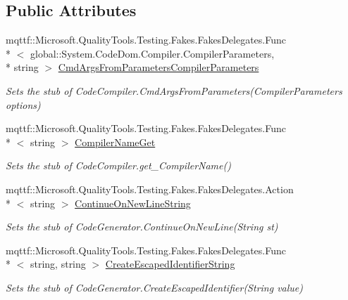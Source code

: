 \subsection*{Public Attributes}
\begin{DoxyCompactItemize}
\item 
mqttf\-::\-Microsoft.\-Quality\-Tools.\-Testing.\-Fakes.\-Fakes\-Delegates.\-Func\\*
$<$ global\-::\-System.\-Code\-Dom.\-Compiler.\-Compiler\-Parameters, \\*
string $>$ \hyperlink{class_system_1_1_code_dom_1_1_compiler_1_1_fakes_1_1_stub_code_compiler_a20ba4bb004c47eaa48c12948a27ffde8}{Cmd\-Args\-From\-Parameters\-Compiler\-Parameters}
\begin{DoxyCompactList}\small\item\em Sets the stub of Code\-Compiler.\-Cmd\-Args\-From\-Parameters(\-Compiler\-Parameters options)\end{DoxyCompactList}\item 
mqttf\-::\-Microsoft.\-Quality\-Tools.\-Testing.\-Fakes.\-Fakes\-Delegates.\-Func\\*
$<$ string $>$ \hyperlink{class_system_1_1_code_dom_1_1_compiler_1_1_fakes_1_1_stub_code_compiler_a1592c0988e2ce3f32515d11d59f7a268}{Compiler\-Name\-Get}
\begin{DoxyCompactList}\small\item\em Sets the stub of Code\-Compiler.\-get\-\_\-\-Compiler\-Name()\end{DoxyCompactList}\item 
mqttf\-::\-Microsoft.\-Quality\-Tools.\-Testing.\-Fakes.\-Fakes\-Delegates.\-Action\\*
$<$ string $>$ \hyperlink{class_system_1_1_code_dom_1_1_compiler_1_1_fakes_1_1_stub_code_compiler_a13c69a5743d57c7f1189e6544323189f}{Continue\-On\-New\-Line\-String}
\begin{DoxyCompactList}\small\item\em Sets the stub of Code\-Generator.\-Continue\-On\-New\-Line(\-String st)\end{DoxyCompactList}\item 
mqttf\-::\-Microsoft.\-Quality\-Tools.\-Testing.\-Fakes.\-Fakes\-Delegates.\-Func\\*
$<$ string, string $>$ \hyperlink{class_system_1_1_code_dom_1_1_compiler_1_1_fakes_1_1_stub_code_compiler_a62e12c80e5d46ead9b25906dc774b8b9}{Create\-Escaped\-Identifier\-String}
\begin{DoxyCompactList}\small\item\em Sets the stub of Code\-Generator.\-Create\-Escaped\-Identifier(\-String value)\end{DoxyCompactList}\item 

\end{DoxyCompactItemize}
